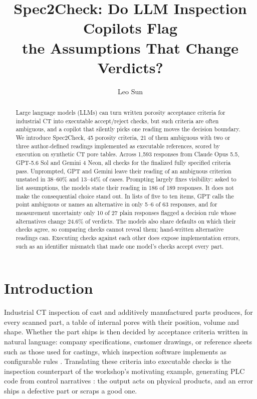 \documentclass[letterpaper]{article} %
\title{Spec2Check: Do LLM Inspection Copilots Flag\\the Assumptions That Change Verdicts?}
\author{
    Leo Sun
}
\begin{document}
\maketitle

\begin{abstract}
Large language models (LLMs) can turn written porosity acceptance criteria for industrial CT into executable accept/reject checks, but such criteria are often ambiguous, and a copilot that silently picks one reading moves the decision boundary. We introduce Spec2Check, 45 porosity criteria, 21 of them ambiguous with two or three author-defined readings implemented as executable references, scored by execution on synthetic CT pore tables. Across 1{,}593 responses from Claude Opus 5.5, GPT-5.6 Sol and Gemini 4 Neon, all checks for the finalized fully specified criteria pass. Unprompted, GPT and Gemini leave their reading of an ambiguous criterion unstated in 38--60\% and 13--44\% of cases. Prompting largely fixes visibility: asked to list assumptions, the models state their reading in 186 of 189 responses. It does not make the consequential choice stand out. In lists of five to ten items, GPT calls the point ambiguous or names an alternative in only 5--6 of 63 responses, and for measurement uncertainty only 10 of 27 plain responses flagged a decision rule whose alternatives change 24.6\% of verdicts. The models also share defaults on which their checks agree, so comparing checks cannot reveal them; hand-written alternative readings can. Executing checks against each other does expose implementation errors, such as an identifier mismatch that made one model's checks accept every part.
\end{abstract}

\section{Introduction}
Industrial CT inspection of cast and additively manufactured parts produces, for every scanned part, a table of internal pores with their position, volume and shape. Whether the part ships is then decided by acceptance criteria written in natural language: company specifications, customer drawings, or reference sheets such as those used for castings, which inspection software implements as configurable rules \cite{vgporosity}. Translating these criteria into executable checks is the inspection counterpart of the workshop's motivating example, generating PLC code from control narratives \cite{fakih2024llm4plc}: the output acts on physical products, and an error ships a defective part or scraps a good one.
\end{document}
